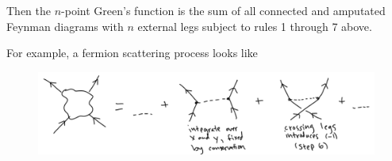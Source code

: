 \noindent Then the $n$-point Green's function is the sum of all connected and amputated Feynman diagrams with $n$ external legs subject to rules 1 through 7 above.

\noindent For example, a fermion scattering process looks like

\begin{figure}[H]\centering \includegraphics[scale=0.5]{fermionscattering.png}  \end{figure}